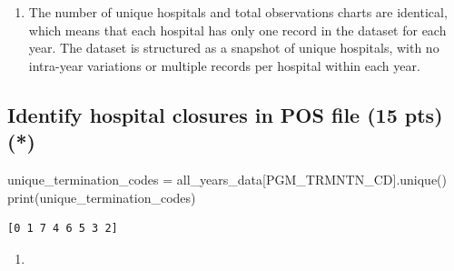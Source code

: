 \documentclass[
  letterpaper,
  DIV=11,
  numbers=noendperiod]{scrartcl}
\newenvironment{Shaded}{\begin{snugshade}}{\end{snugshade}}
\newcommand{\BuiltInTok}[1]{\textcolor[rgb]{0.00,0.23,0.31}{#1}}
\newcommand{\NormalTok}[1]{\textcolor[rgb]{0.00,0.23,0.31}{#1}}
\newcommand{\OperatorTok}[1]{\textcolor[rgb]{0.37,0.37,0.37}{#1}}
\newcommand{\StringTok}[1]{\textcolor[rgb]{0.13,0.47,0.30}{#1}}
\providecommand{\tightlist}{%
  \setlength{\itemsep}{0pt}\setlength{\parskip}{0pt}}\usepackage{longtable,booktabs,array}
\begin{document}
\begin{enumerate}
\def\labelenumi{\alph{enumi}.}
\setcounter{enumi}{1}
\tightlist
\item
  The number of unique hospitals and total observations charts are
  identical, which means that each hospital has only one record in the
  dataset for each year. The dataset is structured as a snapshot of
  unique hospitals, with no intra-year variations or multiple records
  per hospital within each year.
\end{enumerate}

\subsection{Identify hospital closures in POS file (15 pts)
(*)}\label{identify-hospital-closures-in-pos-file-15-pts}

\begin{Shaded}
\begin{Highlighting}[]
\NormalTok{unique\_termination\_codes }\OperatorTok{=}\NormalTok{ all\_years\_data[}\StringTok{\textquotesingle{}PGM\_TRMNTN\_CD\textquotesingle{}}\NormalTok{].unique()}
\BuiltInTok{print}\NormalTok{(unique\_termination\_codes)}
\end{Highlighting}
\end{Shaded}

\begin{verbatim}
[0 1 7 4 6 5 3 2]
\end{verbatim}

\begin{enumerate}
\def\labelenumi{\arabic{enumi}.}
\tightlist
\item
\end{enumerate}
\end{document}
